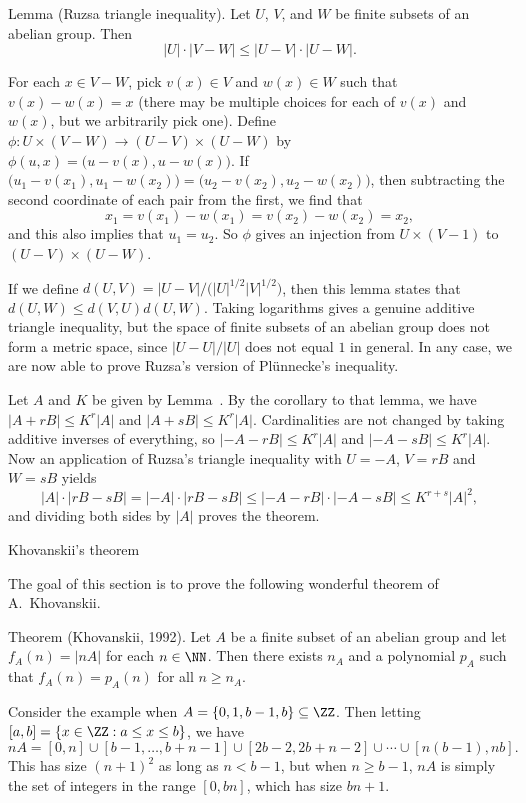 \parenproclaim Lemma {\advthm} (Ruzsa triangle inequality). Let $U$, $V$, and $W$ be finite
subsets of an abelian group. Then
$$|U|\cdot |V-W| \le |U-V|\cdot |U-W|.$$

\proof For each $x\in V-W$, pick $v(x)\in V$ and $w(x)\in W$ such that $v(x)-w(x) = x$ (there may
be multiple choices for each of $v(x)$ and $w(x)$, but we arbitrarily pick one).
Define $\phi : U\times (V-W) \to (U-V)\times (U-W)$ by $\phi(u,x) = \bigl(u-v(x), u-w(x)\bigr)$.
If $\bigl(u_1 - v(x_1), u_1 - w(x_2)\bigr) = \bigl(u_2 - v(x_2), u_2 - w(x_2)\bigr)$, then
subtracting the second coordinate of each pair from the first, we find that
$$x_1 = v(x_1) - w(x_1) = v(x_2) - w(x_2) = x_2,$$
and this also implies that $u_1 = u_2$. So $\phi$ gives an injection from $U\times (V-1)$
to $(U-V)\times (U-W)$.\slug

If we define $d(U,V) = |U-V| / \bigl(|U|^{1/2}|V|^{1/2}\bigr)$, then this lemma states
that $d(U,W) \le d(V,U)d(U,W)$. Taking logarithms gives a genuine additive triangle inequality,
but the space of finite subsets of an abelian group does not form a metric space, since
$|U-U|/|U|$ does not equal $1$ in general. In any case, we are now able to prove Ruzsa's
version of Pl\"unnecke's inequality.

\medskip
{}\enspace Let $A$ and $K$ be given by
Lemma~{\lempetridis}. By the corollary to that lemma, we have $|A+rB| \le K^r|A|$ and
$|A+sB| \le K^r|A|$. Cardinalities are not changed by taking additive inverses of
everything, so $|{-A}-rB| \le K^r|A|$ and $|{-A}-sB|\le K^r|A|$. Now an application of Ruzsa's triangle
inequality with $U = -A$, $V = rB$ and $W = sB$ yields
$$|A|\cdot|rB-sB| = |{-A}|\cdot|rB-sB| \le |{-A}-rB|\cdot|{-A}-sB| \le K^{r+s}|A|^2,$$
and dividing both sides by $|A|$ proves the theorem.\slug

\advsect Khovanskii's theorem

The goal of this section is to prove the following wonderful theorem of A.~Khovanskii.

\edef\thmkhovanskii{\the\thmcount}
\parenproclaim Theorem {\advthm} (Khovanskii, {\rm 1992}). Let $A$ be a finite
subset of an abelian group and let $f_A(n) = |nA|$ for each $n\in \NN$. Then there exists
$n_A$ and a polynomial $p_A$ such that $f_A(n) = p_A(n)$ for all $n\ge n_A$.

Consider the example when $A = \{0,1,b-1,b\} \subseteq \ZZ$. Then letting $[a,b] = \{x\in \ZZ : a\le x\le b\}$,
we have
$$nA = [0, n] \cup [b-1,\ldots, b+n-1] \cup [2b-2, 2b+n-2] \cup\cdots\cup [n(b-1),nb].$$
This has size $(n+1)^2$ as long as $n< b-1$, but when $n\ge b-1$, $nA$ is simply the set
of integers in the range $[0,bn]$, which has size $bn+1$.

